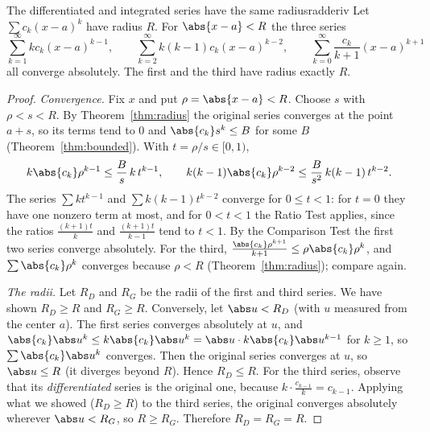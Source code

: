 \documentclass[11pt]{article}
\begin{document}
\begin{thm}{The differentiated and integrated series have the same radius}{radderiv}
Let $\sum c_k(x-a)^k$ have radius $R$. For $\abs{x-a}<R$ the three series
\[
\sum_{k=1}^\infty kc_k(x-a)^{k-1},\qquad\sum_{k=2}^\infty k(k-1)c_k(x-a)^{k-2},\qquad\sum_{k=0}^\infty\frac{c_k}{k+1}(x-a)^{k+1}
\]
all converge absolutely. The first and the third have radius exactly $R$.
\end{thm}
\begin{proof}
\emph{Convergence.} Fix $x$ and put $\rho=\abs{x-a}<R$. Choose $s$ with $\rho<s<R$. By Theorem~\ref{thm:radius} the original series converges at the point $a+s$, so its terms tend to $0$ and $\abs{c_k}s^k\le B$ for some $B$ (Theorem~\ref{thm:bounded}). With $t=\rho/s\in[0,1)$,
\[
k\abs{c_k}\rho^{k-1}\le\frac Bs\,k\,t^{k-1},\qquad k(k-1)\abs{c_k}\rho^{k-2}\le\frac B{s^2}\,k(k-1)\,t^{k-2}.
\]
The series $\sum kt^{k-1}$ and $\sum k(k-1)t^{k-2}$ converge for $0\le t<1$: for $t=0$ they have one nonzero term at most, and for $0<t<1$ the Ratio Test applies, since the ratios $\frac{(k+1)t}k$ and $\frac{(k+1)t}{k-1}$ tend to $t<1$. By the Comparison Test the first two series converge absolutely. For the third, $\frac{\abs{c_k}\rho^{k+1}}{k+1}\le\rho\abs{c_k}\rho^k$, and $\sum\abs{c_k}\rho^k$ converges because $\rho<R$ (Theorem~\ref{thm:radius}); compare again.

\emph{The radii.} Let $R_D$ and $R_G$ be the radii of the first and third series. We have shown $R_D\ge R$ and $R_G\ge R$. Conversely, let $\abs u<R_D$ (with $u$ measured from the center $a$). The first series converges absolutely at $u$, and $\abs{c_k}\abs u^k\le k\abs{c_k}\abs u^k=\abs u\cdot k\abs{c_k}\abs u^{k-1}$ for $k\ge1$, so $\sum\abs{c_k}\abs u^k$ converges. Then the original series converges at $u$, so $\abs u\le R$ (it diverges beyond $R$). Hence $R_D\le R$. For the third series, observe that its \emph{differentiated} series is the original one, because $k\cdot\frac{c_{k-1}}k=c_{k-1}$. Applying what we showed ($R_D\ge R$) to the third series, the original converges absolutely wherever $\abs u<R_G$, so $R\ge R_G$. Therefore $R_D=R_G=R$.
\end{proof}
\end{document}
